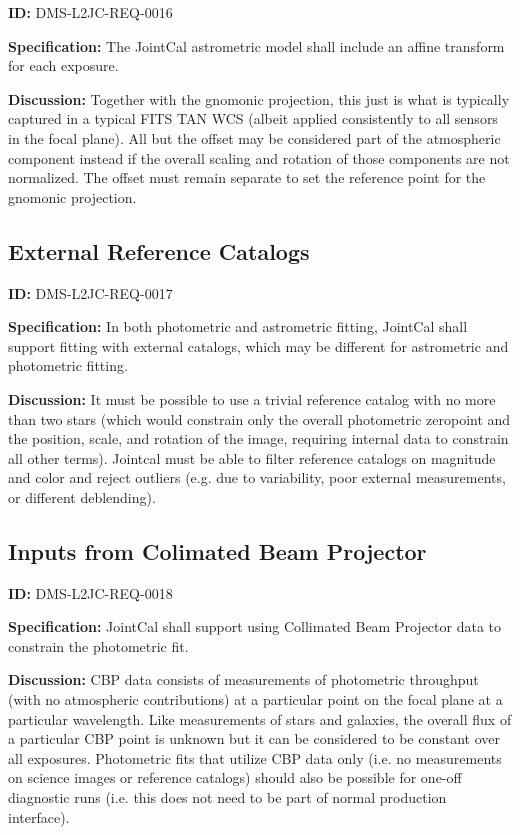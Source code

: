 \documentclass[SE,toc,lsstdraft]{lsstdoc}
\begin{document}
\label{DMS-L2JC-REQ-0016}
\textbf{ID:} DMS-L2JC-REQ-0016

\textbf{Specification:}
The JointCal astrometric model shall include an affine transform for each exposure.

\textbf{Discussion:}
Together with the gnomonic projection, this just is what is typically captured in a typical FITS TAN WCS (albeit applied consistently to all sensors in the focal plane).  All but the offset may be considered part of the atmospheric component instead if the overall scaling and rotation of those components are not normalized.  The offset must remain separate to set the reference point for the gnomonic projection.

\subsection{External Reference Catalogs}

\label{DMS-L2JC-REQ-0017}
\textbf{ID:} DMS-L2JC-REQ-0017

\textbf{Specification:}
In both photometric and astrometric fitting, JointCal shall support fitting with external catalogs, which may be different for astrometric and photometric fitting.

\textbf{Discussion:}
It must be possible to use a trivial reference catalog with no more than two stars (which would constrain only the overall photometric zeropoint and the position, scale, and rotation of the image, requiring internal data to constrain all other terms).  Jointcal must be able to filter reference catalogs on magnitude and color and reject outliers (e.g. due to variability, poor external measurements, or different deblending).

\subsection{Inputs from Colimated Beam Projector}

\label{DMS-L2JC-REQ-0018}
\textbf{ID:} DMS-L2JC-REQ-0018

\textbf{Specification:}
JointCal shall support using Collimated Beam Projector data to constrain the photometric fit.

\textbf{Discussion:}
CBP data consists of measurements of photometric throughput (with no atmospheric contributions) at a particular point on the focal plane at a particular wavelength. Like measurements of stars and galaxies, the overall flux of a particular CBP point is unknown but it can be considered to be constant over all exposures. Photometric fits that utilize CBP data only (i.e. no measurements on science images or reference catalogs) should also be possible for one-off diagnostic runs (i.e. this does not need to be part of normal production interface).
\end{document}
